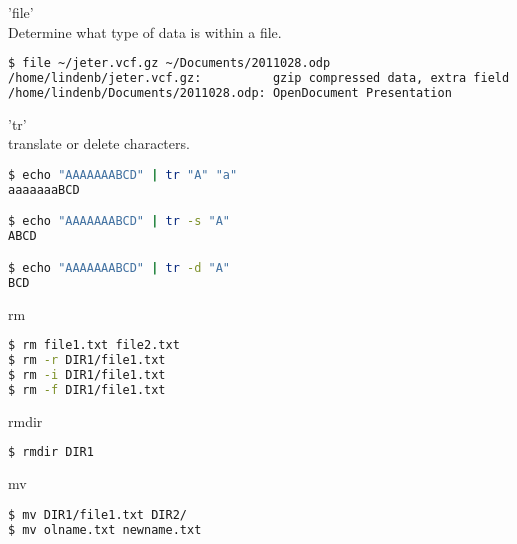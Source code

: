 \documentclass{beamer}
\begin{document}
\begin{frame}[fragile]
 \begin{center}
    \huge{'file'}\\
     	Determine what type of data is within a file.\\
    \end{center}
\begin{lstlisting}[language=bash]
$ file ~/jeter.vcf.gz ~/Documents/2011028.odp
/home/lindenb/jeter.vcf.gz:          gzip compressed data, extra field
/home/lindenb/Documents/2011028.odp: OpenDocument Presentation
\end{lstlisting}
\end{frame}


\begin{frame}[fragile]
 \begin{center}
    \huge{'tr'}\\
     	translate or delete characters.\\
    \end{center}
\begin{lstlisting}[language=bash]
$ echo "AAAAAAABCD" | tr "A" "a"
aaaaaaaBCD

$ echo "AAAAAAABCD" | tr -s "A" 
ABCD

$ echo "AAAAAAABCD" | tr -d "A" 
BCD
\end{lstlisting}
\end{frame}

\begin{frame}[fragile]
 \begin{center}
    \huge{rm}\\
    \end{center}
\begin{lstlisting}[language=bash]
$ rm file1.txt file2.txt
$ rm -r DIR1/file1.txt
$ rm -i DIR1/file1.txt
$ rm -f DIR1/file1.txt
\end{lstlisting}
\end{frame}



\begin{frame}[fragile]
 \begin{center}
    \huge{rmdir}\\
    \end{center}
\begin{lstlisting}[language=bash]
$ rmdir DIR1
\end{lstlisting}
\end{frame}

\begin{frame}[fragile]
 \begin{center}
    \huge{mv}\\
    \end{center}
\begin{lstlisting}[language=bash]
$ mv DIR1/file1.txt DIR2/
$ mv olname.txt newname.txt
\end{lstlisting}
\end{frame}
\end{document}
